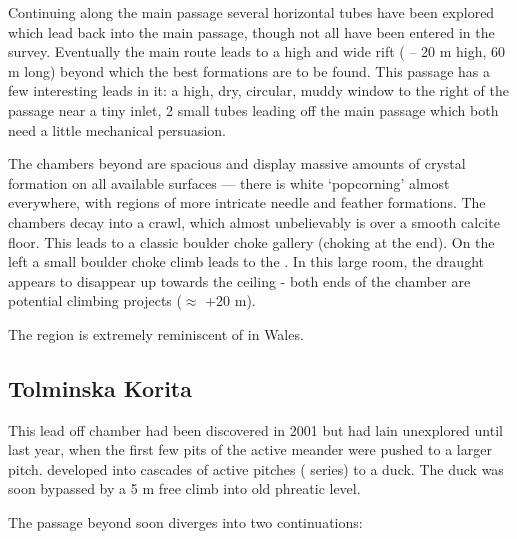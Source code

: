Continuing along the main  passage several horizontal tubes have been explored which lead back into the main passage, though not all have
been entered in the survey. Eventually the main route leads to a high and wide rift ( -- 20 m high, 60 m long) beyond
which the best formations are to be found. This passage has a few interesting leads in it: a high, dry, circular, muddy window to the right of the passage near a tiny inlet, 2 small tubes leading off the main passage which both need a little mechanical persuasion.

The chambers beyond  are spacious and display massive amounts of crystal formation on all available surfaces --- there is
white `popcorning' almost everywhere, with regions of more intricate needle and feather formations. The chambers decay into a crawl, which almost unbelievably is over a smooth calcite floor. This leads to a classic boulder choke gallery (choking at the end). On the left a small boulder choke climb leads to the . In this large room, the draught appears to disappear up towards the ceiling - both ends of
the chamber are potential climbing projects ($\approx$ +20 m).

The region is extremely reminiscent of  in Wales.


\subsection{Tolminska Korita}

This lead off  chamber had been discovered in 2001 but had lain unexplored until last year, when the first few pits of the active meander were pushed to a larger pitch.  developed into cascades of active pitches ( series) to a duck. The
duck was soon bypassed by a 5 m free climb into old phreatic level.

The passage beyond soon diverges into two continuations:



